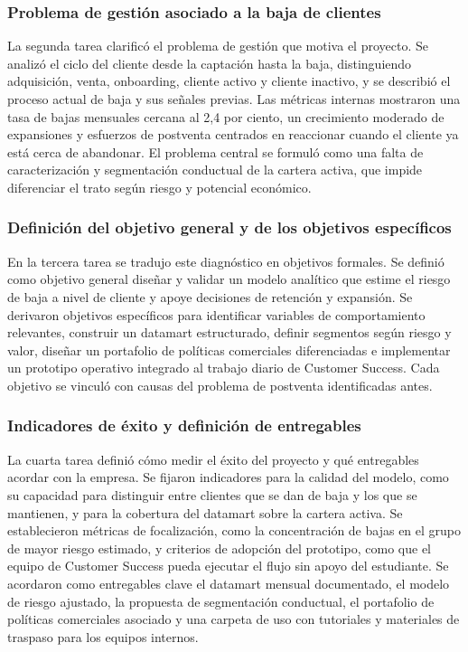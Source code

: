 \subsubsection{Problema de gestión asociado a la baja de clientes}

La segunda tarea clarificó el problema de gestión que motiva el proyecto. Se analizó el ciclo del cliente desde la captación hasta la baja, distinguiendo adquisición, venta, onboarding, cliente activo y cliente inactivo, y se describió el proceso actual de baja y sus señales previas. Las métricas internas mostraron una tasa de bajas mensuales cercana al 2,4 por ciento, un crecimiento moderado de expansiones y esfuerzos de postventa centrados en reaccionar cuando el cliente ya está cerca de abandonar. El problema central se formuló como una falta de caracterización y segmentación conductual de la cartera activa, que impide diferenciar el trato según riesgo y potencial económico.

\subsubsection{Definición del objetivo general y de los objetivos específicos}

En la tercera tarea se tradujo este diagnóstico en objetivos formales. Se definió como objetivo general diseñar y validar un modelo analítico que estime el riesgo de baja a nivel de cliente y apoye decisiones de retención y expansión. Se derivaron objetivos específicos para identificar variables de comportamiento relevantes, construir un datamart estructurado, definir segmentos según riesgo y valor, diseñar un portafolio de políticas comerciales diferenciadas e implementar un prototipo operativo integrado al trabajo diario de Customer Success. Cada objetivo se vinculó con causas del problema de postventa identificadas antes.

\subsubsection{Indicadores de éxito y definición de entregables}

La cuarta tarea definió cómo medir el éxito del proyecto y qué entregables acordar con la empresa. Se fijaron indicadores para la calidad del modelo, como su capacidad para distinguir entre clientes que se dan de baja y los que se mantienen, y para la cobertura del datamart sobre la cartera activa. Se establecieron métricas de focalización, como la concentración de bajas en el grupo de mayor riesgo estimado, y criterios de adopción del prototipo, como que el equipo de Customer Success pueda ejecutar el flujo sin apoyo del estudiante. Se acordaron como entregables clave el datamart mensual documentado, el modelo de riesgo ajustado, la propuesta de segmentación conductual, el portafolio de políticas comerciales asociado y una carpeta de uso con tutoriales y materiales de traspaso para los equipos internos.

